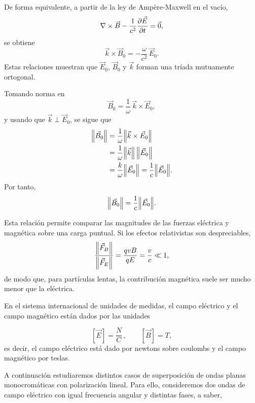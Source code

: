 \documentclass[../main.tex]{subfiles}
\begin{document}
De forma equivalente, a partir de la ley de Ampère-Maxwell en el vacío,
\begin{equation*}
    \nabla\times \vec{B}-\frac{1}{c^2}\frac{\partial \vec{E}}{\partial t}=\vec 0,
\end{equation*}
se obtiene
\begin{equation*}
    \vec k\times \vec B_0=-\frac{\omega}{c^2}\,\vec E_0.
\end{equation*}
Estas relaciones muestran que $\vec E_0$, $\vec B_0$ y $\vec k$ forman una tríada mutuamente ortogonal.

Tomando norma en
\begin{equation*}
    \vec B_0=\frac{1}{\omega}\,\vec k\times \vec E_0,
\end{equation*}
y usando que $\vec k\perp \vec E_0$, se sigue que
\begin{align*}
    \norm{\vec B_0}
    &=\frac{1}{\omega}\norm{\vec k\times \vec E_0} \\
    &=\frac{1}{\omega}\norm{\vec k}\,\norm{\vec E_0} \\
    &=\frac{k}{\omega}\norm{\vec E_0}
    =\frac{1}{c}\norm{\vec E_0}.
\end{align*}
Por tanto,
\begin{equation*}
    \norm{\vec B_0}=\frac{1}{c}\norm{\vec E_0}.
\end{equation*}

Esta relación permite comparar las magnitudes de las fuerzas eléctrica y magnética sobre una carga puntual. Si los efectos relativistas son despreciables,
\begin{equation*}
    \frac{\norm{\vec F_B}}{\norm{\vec F_E}}
    =\frac{qvB}{qE}
    =\frac{v}{c}\ll 1,
\end{equation*}
de modo que, para partículas lentas, la contribución magnética suele ser mucho menor que la eléctrica.

En el sistema internacional de unidades de medidas, el campo eléctrico y el campo magnético están dados por las unidades

\begin{equation*}
    \left[\vec E\right]= \frac{N}{C} \, ,\qquad \left[ \vec B\right]=T,
\end{equation*}
es decir, el campo eléctrico está dado por newtons sobre coulombs y el campo magnético por teslas.

A continuación estudiaremos distintos casos de superposición de ondas planas monocromáticas con polarización lineal. Para ello, consideremos dos ondas de campo eléctrico con igual frecuencia angular y distintas fases, a saber,
\end{document}
